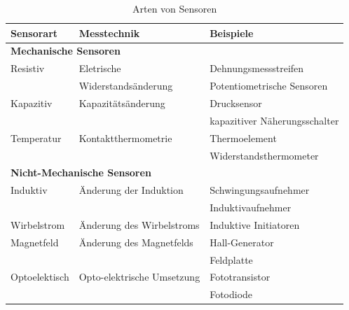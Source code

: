         \begin{table}
        \begin{tabularx}{\textwidth} {l|l|l}

                    \textbf{Sensorart} & \textbf{Messtechnik} & \textbf{Beispiele}\\
					\hline
                    \multicolumn{3}{l}{\textbf{Mechanische Sensoren}}\\
                    \hline
					Resistiv & Eletrische & Dehnungsmessstreifen \\
					&Widerstandsänderung& Potentiometrische Sensoren\\
					\hline
                    
                    Kapazitiv & Kapazitätsänderung & Drucksensor\\
                    && kapazitiver Näherungsschalter \\
					\hline
					
					Temperatur & Kontaktthermometrie & Thermoelement\\
					&& Widerstandsthermometer \\
                    \hline

                    \multicolumn{3}{l}{\textbf{Nicht-Mechanische Sensoren}}\\
                    \hline

                    Induktiv & Änderung der Induktion & Schwingungsaufnehmer \\
                    && Induktivaufnehmer\\
                    \hline
								
                    Wirbelstrom & Änderung des Wirbelstroms & Induktive Initiatoren\\
                    \hline
                    
                    Magnetfeld & Änderung des Magnetfelds & Hall-Generator\\
                    && Feldplatte\\
                    \hline

                    Optoelektisch & Opto-elektrische Umsetzung & Fototransistor\\
                    && Fotodiode\\
                    

                \end{tabularx}\\
                \caption{Arten von Sensoren}
                \label{fig:TS09}
            \end{table}

